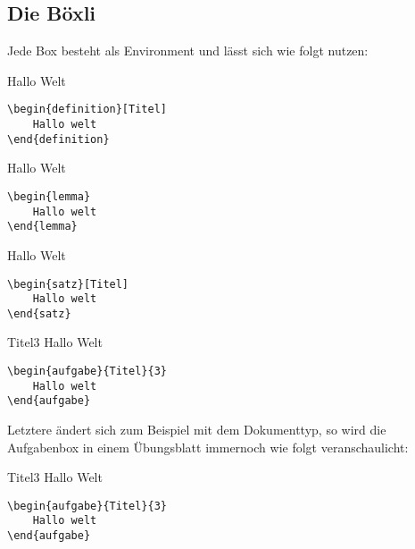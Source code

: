 \subsection[Wie funktionieren Boxen]{Die Böxli}
Jede Box besteht als Environment und lässt sich wie folgt nutzen:
\begin{multicols}{2}
\begin{definition}[Titel]
    Hallo Welt
\begin{lstlisting}[language=lLatex]
\begin{definition}[Titel]
    Hallo welt
\end{definition}\end{lstlisting}
\end{definition}

\begin{lemma}
    Hallo Welt
\begin{lstlisting}[language=lLatex]
\begin{lemma}
    Hallo welt
\end{lemma}\end{lstlisting}
\end{lemma}

\begin{satz}[Titel]
    Hallo Welt
\begin{lstlisting}[language=lLatex]
\begin{satz}[Titel]
    Hallo welt
\end{satz}\end{lstlisting}
\end{satz}
\def\LILLYxBOXxAufgabexBox{FALSE}
\begin{aufgabe}{Titel}{3}
    Hallo Welt
\begin{lstlisting}[language=lLatex]
\begin{aufgabe}{Titel}{3}
    Hallo welt
\end{aufgabe}\end{lstlisting}
\end{aufgabe}
\end{multicols}
Letztere ändert sich zum Beispiel mit dem Dokumenttyp, so wird die Aufgabenbox in einem Übungsblatt immernoch wie folgt veranschaulicht:
\def\LILLYxBOXxAufgabexBox{TRUE}
\begin{aufgabe}{Titel}{3}
    Hallo Welt
\begin{lstlisting}[language=lLatex]
\begin{aufgabe}{Titel}{3}
    Hallo welt
\end{aufgabe}\end{lstlisting}
\end{aufgabe}

